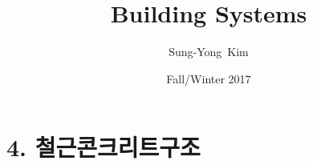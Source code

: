 \documentclass[9pt]{beamer}
\title{Building Systems}
\author{Sung-Yong~Kim\inst{1}}
\institute[Changwon National University] %
{
	\inst{1}%
	Ph\,D, Department of Architecture and Architectural Engineering\\
	Seoul National University}
\date{Fall/Winter 2017}
\begin{document}
\section{4. 철근콘크리트구조}	
\begin{frame}

\end{frame}
\end{document}
